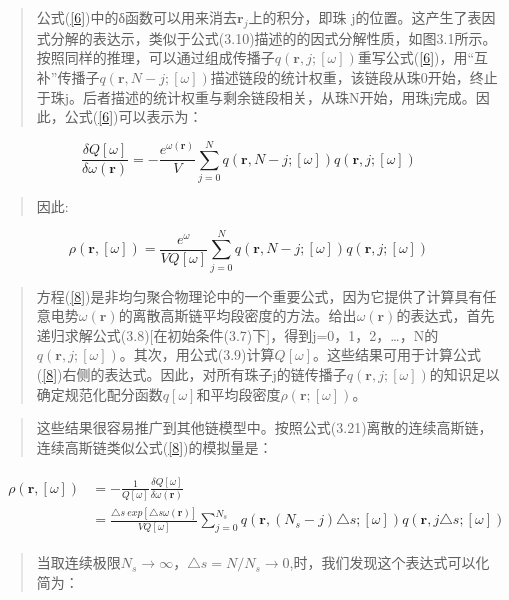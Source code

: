 \begin{quotation}
公式(\ref{6})中的δ函数可以用来消去$\mathbf{r}_{j}$上的积分，即珠 j的位置。这产生了表因式分解的表达示，类似于公式(3.10)描述的的因式分解性质，如图3.1所示。按照同样的推理，可以通过组成传播子$q(\mathbf{r},j;[\omega])$重写公式(\ref{6})，用“互补”传播子$q(\mathbf{r},N-j;[\omega])$描述链段的统计权重，该链段从珠0开始，终止于珠j。后者描述的统计权重与剩余链段相关，从珠N开始，用珠j完成。因此，公式(\ref{6})可以表示为：
\end{quotation}
\begin{equation}\label{7}
\frac{\delta Q[\omega]}{\delta \omega(\mathbf{\mathbf{\mathbf{r}}})}=-\frac{e^{\omega(\mathbf{r})}}{V}\sum_{j=0}^{N}q(\mathbf{r},N-j;[\omega])q(\mathbf{r},j;[\omega])
\end{equation}
\begin{quotation}
因此:	
\end{quotation}
\begin{equation}\label{8}
\rho(\mathbf{r},[\omega])=\frac{e^{\omega}}{VQ[\omega]}\sum_{j=0}^{N}q(\mathbf{r},N-j;[\omega])q(\mathbf{r},j;[\omega])
\end{equation}
\begin{quotation}
方程(\ref{8})是非均匀聚合物理论中的一个重要公式，因为它提供了计算具有任意电势$\omega(\mathbf{r})$的离散高斯链平均段密度的方法。给出$\omega(\mathbf{r})$的表达式，首先递归求解公式(3.8)[在初始条件(3.7)下]，得到j=0，1，2，…，N的$q(\mathbf{r},j;[\omega])$。其次，用公式(3.9)计算$Q[\omega]$。这些结果可用于计算公式(\ref{8})右侧的表达式。因此，对所有珠子j的链传播子$q(\mathbf{r},j;[\omega])$的知识足以确定规范化配分函数$q[\omega]$和平均段密度$\rho(\mathbf{r};[\omega])$。
\end{quotation}
\begin{quotation}
这些结果很容易推广到其他链模型中。按照公式(3.21)离散的连续高斯链，连续高斯链类似公式(\ref{8})的模拟量是：
\end{quotation}
\begin{align}\label{9}
\begin{split}
\rho(\mathbf{r},[\omega])&=-\frac{1}{Q[\omega]}\frac{\delta Q[\omega]}{\delta \omega(\mathbf{r})}\\ &=\frac{\triangle s ~exp[\triangle s\omega(\mathbf{r})]}{VQ[\omega]}\sum_{j=0}^{N_s}q(\mathbf{r},(N_s-j)\triangle s;[\omega])q(\mathbf{r},j\triangle s;[\omega])
\end{split}
\end{align}
\begin{quotation}
当取连续极限$N_s\to \infty$，$\triangle s=N/N_s\to 0$,时，我们发现这个表达式可以化简为：
\end{quotation}
